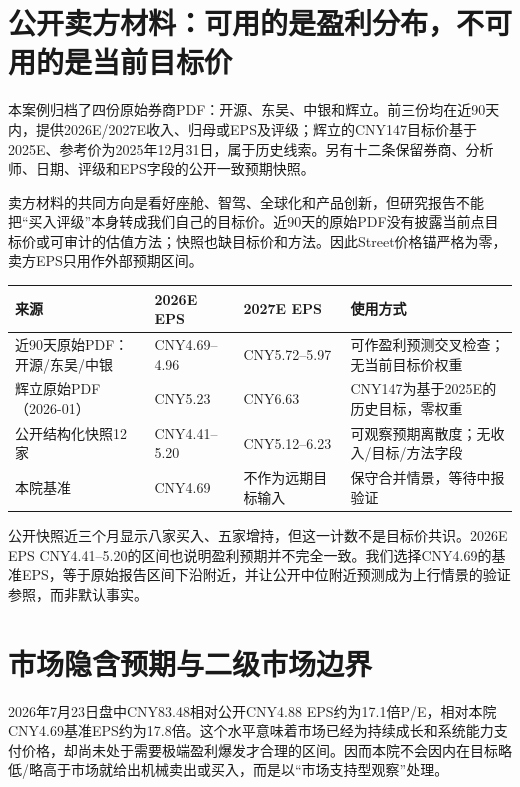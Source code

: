 \section{公开卖方材料：可用的是盈利分布，不可用的是当前目标价}

本案例归档了四份原始券商PDF：开源、东吴、中银和辉立。前三份均在近90天内，提供2026E/2027E收入、归母或EPS及评级；辉立的CNY147目标价基于2025E、参考价为2025年12月31日，属于历史线索。另有十二条保留券商、分析师、日期、评级和EPS字段的公开一致预期快照。

卖方材料的共同方向是看好座舱、智驾、全球化和产品创新，但研究报告不能把“买入评级”本身转成我们自己的目标价。近90天的原始PDF没有披露当前点目标价或可审计的估值方法；快照也缺目标价和方法。因此Street价格锚严格为零，卖方EPS只用作外部预期区间。

\begin{exhibitbox}[公开盈利预期与来源质量]
\small
\begin{tabularx}{\textwidth}{L{2.4cm}Y Y Y}
\toprule
来源 & 2026E EPS & 2027E EPS & 使用方式 \\
\midrule
近90天原始PDF：开源/东吴/中银 & CNY4.69--4.96 & CNY5.72--5.97 & 可作盈利预测交叉检查；无当前目标价权重 \\
辉立原始PDF（2026-01） & CNY5.23 & CNY6.63 & CNY147为基于2025E的历史目标，零权重 \\
公开结构化快照12家 & CNY4.41--5.20 & CNY5.12--6.23 & 可观察预期离散度；无收入/目标/方法字段 \\
本院基准 & CNY4.69 & 不作为远期目标输入 & 保守合并情景，等待中报验证 \\
\bottomrule
\end{tabularx}
\end{exhibitbox}

公开快照近三个月显示八家买入、五家增持，但这一计数不是目标价共识。2026E EPS CNY4.41--5.20的区间也说明盈利预期并不完全一致。我们选择CNY4.69的基准EPS，等于原始报告区间下沿附近，并让公开中位附近预测成为上行情景的验证参照，而非默认事实。

\section{市场隐含预期与二级市场边界}

2026年7月23日盘中CNY83.48相对公开CNY4.88 EPS约为17.1倍P/E，相对本院CNY4.69基准EPS约为17.8倍。这个水平意味着市场已经为持续成长和系统能力支付价格，却尚未处于需要极端盈利爆发才合理的区间。因而本院不会因内在目标略低/略高于市场就给出机械卖出或买入，而是以“市场支持型观察”处理。

